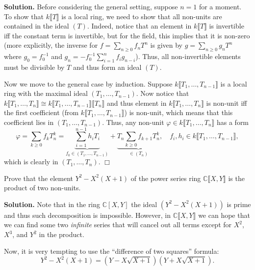 \documentclass{template}
\newcommand{\qedwhite}{\hfill \ensuremath{\Box}}
\begin{document}
\textbf{Solution.} Before considering the general setting, suppose $n=1$ for a
moment. To show that $k\lBrack T \rBrack$ is a local ring, we need to show that
all non-units are contained in the ideal $(T)$. Indeed, notice that an element
in $k\lBrack T \rBrack$ is invertible iff the constant term is invertible, but
for the field, this implies that it is non-zero (more explicitly, the inverse
for $f = \sum_{n \geq 0}f_nT^n$ is given by $g = \sum_{n \geq 0}g_nT^n$ where
$g_0=f_0^{-1}$ and $g_n = -f_0^{-1}\sum_{i=1}^n f_ig_{n-i}$). Thus, all
non-invertible elements must be divisible by $T$ and thus form an ideal $(T)$.  

Now we move to the general case by induction. Suppose $k\lBrack
T_1,\dots,T_{n-1} \rBrack$ is a local ring with the maximal ideal
$(T_1,\dots,T_{n-1})$. Now notice that $k\lBrack T_1,\dots, T_n \rBrack \cong
k\lBrack T_1,\dots, T_{n-1} \rBrack\lBrack T_n \rBrack$ and thus element in
$k\lBrack T_1,\dots, T_n \rBrack$ is non-unit iff the first coefficient (from
$k\lBrack T_1,\dots, T_{n-1} \rBrack$) is non-unit, which means that this
coefficient lies in $(T_1,\dots,T_{n-1})$. Thus, any non-unit $\varphi \in
k\lBrack T_1,\dots, T_n \rBrack$ has a form
\begin{equation*}
    \varphi = \sum_{k \geq 0}f_kT_n^k = \underbrace{\sum_{i=1}^{n-1}h_iT_i}_{f_0 \in (T_1,\dots,T_{n-1})} + \underbrace{T_n\sum_{k \geq 0} f_{k+1}T_n^k}_{\in (T_n)}, \quad f_i, h_i \in k\lBrack T_1,\dots, T_{n-1} \rBrack,
\end{equation*}
which is clearly in $(T_1,\dots,T_n)$. \qedwhite

\begin{problem}[Exercise 5]
    Prove that the element $Y^2-X^2(X+1)$ of the power series ring
    $\mathbb{C}\lBrack X,Y \rBrack$ is the product of two non-units.
\end{problem}

\textbf{Solution.} Note that in the ring $\mathbb{C}[X,Y]$ the ideal
$(Y^2-X^2(X+1))$ is prime and thus such decomposition is impossible. However, in
$\mathbb{C}\lBrack X,Y \rBrack$ we can hope that we can find some two
\textit{infinite} series that will cancel out all terms except for $X^2$, $X^3$,
and $Y^2$ in the product. 

Now, it is very tempting to use the ``difference of two squares'' formula:
\begin{equation*}
    Y^2 - X^2(X+1) = (Y - X\sqrt{X+1})(Y + X\sqrt{X+1}).
\end{equation*}
\end{document}
